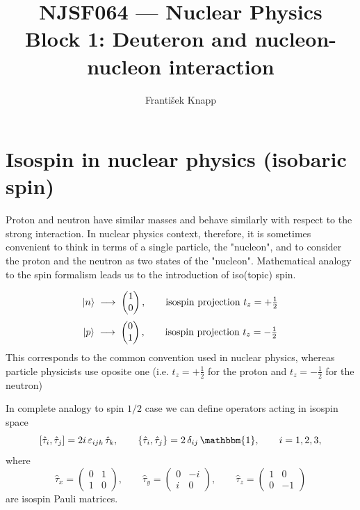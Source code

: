 \documentclass[11pt,a4paper]{article}
\title{NJSF064 --- Nuclear Physics\\[2mm]\large Block 1: Deuteron and nucleon-nucleon interaction}
\author{František Knapp}
\date{}
\newcommand{\op}[1]{\hat{#1}}
\begin{document}
\maketitle


\section{Isospin in nuclear physics (isobaric spin)}
Proton and neutron have similar masses and behave similarly with respect to the strong interaction. In nuclear physics context, therefore, it is sometimes convenient to think in terms of a single particle, the "nucleon", and to consider the proton and the neutron as two states of the "nucleon". Mathematical analogy to the spin formalism leads us to the introduction of iso(topic) spin.

\[
\ket{n} \;\longrightarrow\; \begin{pmatrix}1\\0\end{pmatrix},
\qquad \text{isospin projection } t_z = +\tfrac12 
\]
\[
\ket{p} \;\longrightarrow\; \begin{pmatrix}0\\1\end{pmatrix},
\qquad  \text{isospin projection } t_z = -\tfrac12 
\]
This corresponds to the common convention used in nuclear physics, whereas particle physicists use oposite one (i.e. $t_z = +\tfrac12 $ for the proton and $t_z = -\tfrac12 $  for the neutron)

In complete analogy to spin $1/2$ case we can define operators acting in isospin space
\[        
[\op\tau_i,\op\tau_j] = 2i\,\varepsilon_{ijk}\,\op\tau_k ,
\qquad
\{\op\tau_i,\op\tau_j\} = 2\,\delta_{ij}\,\mathbbm{1},
\qquad i=1,2,3 ,
\]
where 
\[
\op\tau_x=\begin{pmatrix}0&1\\1&0\end{pmatrix},\qquad
\op\tau_y=\begin{pmatrix}0&-i\\ i&0\end{pmatrix},\qquad
\op\tau_z=\begin{pmatrix}1&0\\0&-1\end{pmatrix}
\]
are isospin Pauli matrices. 
\end{document}
